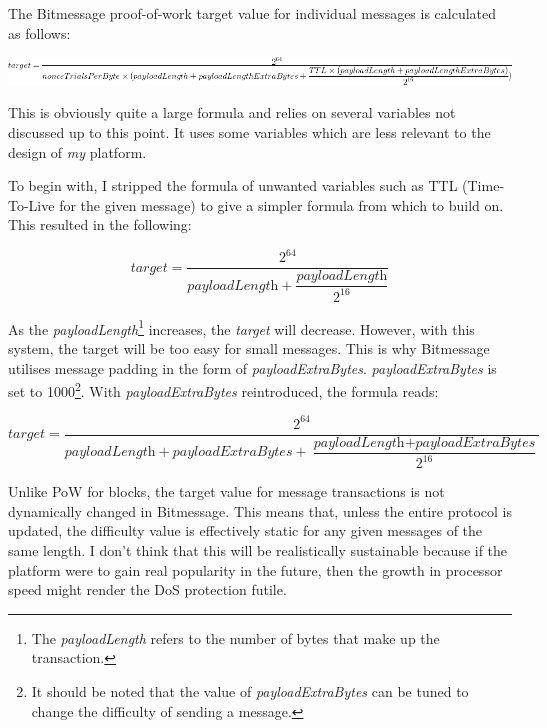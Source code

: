 \documentclass{article}
\begin{document}
The Bitmessage proof-of-work target value for individual messages is calculated as follows:

\begin{center}
\includegraphics[width=\linewidth]{Images/Diagrams/bitmessage_pow.png}
\end{center}

This is obviously quite a large formula and relies on several variables not discussed up to this point. It uses some variables which are less relevant to the design of \textit{my} platform.

To begin with, I stripped the formula of unwanted variables such as TTL (Time-To-Live for the given message) to give a simpler formula from which to build on. This resulted in the following:
\begin{center}
\[\textit{target} = \dfrac{2^{64}}{\textit{payloadLength} + \dfrac{\textit{payloadLength}}{2^{16}}}\]
\end{center}

As the \textit{payloadLength}\footnote{The \textit{payloadLength} refers to the number of bytes that make up the transaction.} increases, the \textit{target} will decrease. However, with this system, the target will be too easy for small messages. This is why Bitmessage utilises message padding in the form of \textit{payloadExtraBytes}. \textit{payloadExtraBytes} is set to 1000\footnote{It should be noted that the value of \textit{payloadExtraBytes} can be tuned to change the difficulty of sending a message. }. With \textit{payloadExtraBytes} reintroduced, the formula reads:
\begin{center}
\[\textit{target} = \dfrac{2^{64}}{\textit{payloadLength} + \textit{payloadExtraBytes}  + \dfrac{\textit{payloadLength} + \textit{payloadExtraBytes}}{2^{16}}}\]
\end{center}

Unlike PoW for blocks, the target value for message transactions is not dynamically changed in Bitmessage. This means that, unless the entire protocol is updated, the difficulty value is effectively static for any given messages of the same length. I don't think that this will be realistically sustainable because if the platform were to gain real popularity in the future, then the growth in processor speed might render the DoS protection futile.
\end{document}
